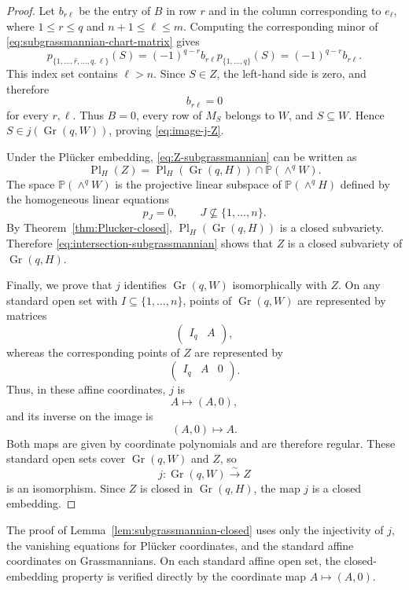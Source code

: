 \documentclass{siamonline250211}
\newcommand{\PP}{\mathbb P}
\newcommand{\Gr}{\operatorname{Gr}}
\newcommand{\Pl}{\operatorname{Pl}}
\begin{document}
\begin{proof}
Let $b_{r\ell}$ be the entry of $B$ in row $r$ and in the column corresponding
to $e_\ell$, where $1\leq r\leq q$ and $n+1\leq\ell\leq m$. Computing the
corresponding minor of \eqref{eq:subgrassmannian-chart-matrix} gives
\[
  p_{\{1,\ldots,\widehat r,\ldots,q,\ell\}}(S)
  =(-1)^{q-r}b_{r\ell}p_{\{1,\ldots,q\}}(S)
  =(-1)^{q-r}b_{r\ell}.
\]
This index set contains $\ell>n$. Since $S\in Z$, the left-hand side is zero,
and therefore
\[
  b_{r\ell}=0
\]
for every $r,\ell$. Thus $B=0$, every row of $M_S$ belongs to $W$, and
$S\subseteq W$. Hence $S\in j(\Gr(q,W))$, proving
\eqref{eq:image-j-Z}.

Under the Pl\"ucker embedding, \eqref{eq:Z-subgrassmannian} can be written as
\begin{equation}\label{eq:intersection-subgrassmannian}
  \Pl_H(Z)
  =\Pl_H(\Gr(q,H))\cap\PP(\wedge^qW).
\end{equation}
The space $\PP(\wedge^qW)$ is the projective linear subspace of
$\PP(\wedge^qH)$ defined by the homogeneous linear equations
\[
  p_J=0,
  \qquad J\nsubseteq\{1,\ldots,n\}.
\]
By Theorem~\ref{thm:Plucker-closed}, $\Pl_H(\Gr(q,H))$ is a closed subvariety.
Therefore \eqref{eq:intersection-subgrassmannian} shows that $Z$ is a closed
subvariety of $\Gr(q,H)$.

Finally, we prove that $j$ identifies $\Gr(q,W)$ isomorphically with $Z$. On any
standard open set with $I\subseteq\{1,\ldots,n\}$, points of $\Gr(q,W)$ are
represented by matrices
\[
  \begin{pmatrix}I_q&A\end{pmatrix},
\]
whereas the corresponding points of $Z$ are represented by
\[
  \begin{pmatrix}I_q&A&0\end{pmatrix}.
\]
Thus, in these affine coordinates, $j$ is
\[
  A\longmapsto(A,0),
\]
and its inverse on the image is
\[
  (A,0)\longmapsto A.
\]
Both maps are given by coordinate polynomials and are therefore regular. These
standard open sets cover $\Gr(q,W)$ and $Z$, so
\[
  j:\Gr(q,W)\xrightarrow{\sim}Z
\]
is an isomorphism. Since $Z$ is closed in $\Gr(q,H)$, the map $j$ is a closed
embedding.
\end{proof}

\begin{remark}
The proof of Lemma~\ref{lem:subgrassmannian-closed} uses only the injectivity of
$j$, the vanishing equations for Pl\"ucker coordinates, and the standard affine
coordinates on Grassmannians. On each standard affine open set, the
closed-embedding property is verified directly by the coordinate map
$A\mapsto(A,0)$.
\end{remark}
\end{document}
